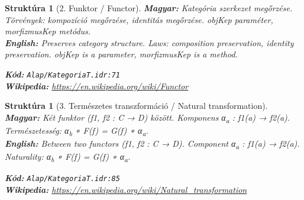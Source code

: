 \documentclass[11pt,a4paper,twocolumn]{article}
\newtheorem{struktura}[tetel]{Struktúra}
\begin{document}
\vspace{0.5cm}

\begin{struktura}[2. Funktor / Functor]

\textbf{Magyar:} Kategória szerkezet megőrzése. Törvények: kompozíció megőrzése, identitás megőrzése. objKep paraméter, morfizmusKep metódus.\\

\textbf{English:} Preserves category structure. Laws: composition preservation, identity preservation. objKep is a parameter, morfizmusKep is a method.\\

\begin{center}
\end{center}

\textbf{Kód:} \texttt{Alap/KategoriaT.idr:71}\\
\textbf{Wikipedia:} \url{https://en.wikipedia.org/wiki/Functor}

\end{struktura}

\vspace{0.5cm}

\begin{struktura}[3. Természetes transzformáció / Natural transformation]

\textbf{Magyar:} Két funktor (f1, f2 : C → D) között. Komponens α\textsubscript{a} : f1(a) → f2(a). Természetesség: α\textsubscript{b} ∘ F(f) = G(f) ∘ α\textsubscript{a}.\\

\textbf{English:} Between two functors (f1, f2 : C → D). Component α\textsubscript{a} : f1(a) → f2(a). Naturality: α\textsubscript{b} ∘ F(f) = G(f) ∘ α\textsubscript{a}.\\

\begin{center}
\end{center}

\textbf{Kód:} \texttt{Alap/KategoriaT.idr:85}\\
\textbf{Wikipedia:} \url{https://en.wikipedia.org/wiki/Natural_transformation}

\end{struktura}
\end{document}
